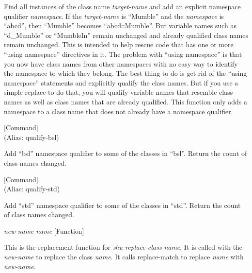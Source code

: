 \begin{doc-string}
Find all instances of the class name \emph{target-name} and add an explicit namespace
qualifier \emph{namespace}.  If the \emph{target-name} is ``Mumble'' and the \emph{namespace} is
``abcd'', then ``Mumble'' becomes ``abcd::Mumble''.  But variable names such
as ``d\_Mumble'' or ``MumbleIn'' remain unchanged and already qualified class
names remain unchanged.
This is intended to help rescue code that has one or more ``using namespace''
directives in it.  The problem with ``using namespace'' is that you now have
class names from other namespaces with no easy way to identify the namespace
to which they belong.  The best thing to do is get rid of the ``using
namespace'' statements and explicitly qualify the class names.  But if you
use a simple replace to do that, you will qualify variable names that resemble
class names as well as class names that are already qualified.  This function
only adds a namespace to a class name that does not already have a namespace
qualifier.
\end{doc-string}

\vspace{1em}
\noindent
{}
\usebox{\funcname}
 \hfill [Command]\\%
 (Alias: qualify-bsl)

\begin{doc-string}
Add ``bsl'' namespace qualifier to some of the classes in ``bsl''.  Return the
count of class names changed.
\end{doc-string}

\vspace{1em}
\noindent
{}
\usebox{\funcname}
 \hfill [Command]\\%
 (Alias: qualify-std)

\begin{doc-string}
Add ``std'' namespace qualifier to some of the classes in ``std''.  Return the
count of class names changed.
\end{doc-string}

\vspace{1em}
\noindent
{}
\usebox{\funcname}\emph{new-name} \emph{name}
 \hfill [Function]

\begin{doc-string}
This is the replacement function for \emph{shu-replace-class-name}.  It is called
with the \emph{new-name} to replace the class \emph{name}.  It calls replace-match to replace
\emph{name} with \emph{new-name}.
\end{doc-string}


